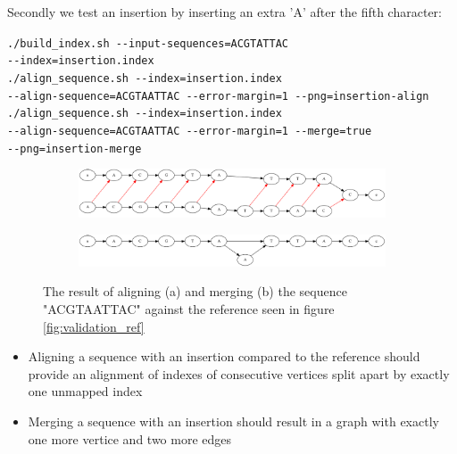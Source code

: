 \documentclass[thesis.tex]{subfiles}
\begin{document}
Secondly we test an insertion by inserting an extra 'A' after the fifth character:\\
\par\noindent
\texttt{./build\_index.sh -{}-input-sequences=ACGTATTAC \\
-{}-index=insertion.index}\\
\texttt{./align\_sequence.sh -{}-index=insertion.index \\
-{}-align-sequence=ACGTAATTAC -{}-error-margin=1 -{}-png=insertion-align}\\
\texttt{./align\_sequence.sh -{}-index=insertion.index \\
-{}-align-sequence=ACGTAATTAC -{}-error-margin=1 -{}-merge=true \\
-{}-png=insertion-merge}\\
\begin{figure}[!h]
  \begin{mdframed}
  \begin{subfigure}[t]{\textwidth}
      \includegraphics[width=\textwidth]{output/insertion-align.png}
    \subcaption{}
  \end{subfigure}
  \begin{subfigure}[t]{\textwidth}
      \includegraphics[width=\textwidth]{output/insertion-merge.png}
    \subcaption{}
  \end{subfigure} 
\end{mdframed}
  \caption[Aligning and merging an insertion with \ref{fig:validation_ref}]{The result of aligning (a) and merging (b) the sequence "ACGTAATTAC" against the reference seen in figure \ref{fig:validation_ref}}
  \label{fig:validation_insertion}
\end{figure}
\begin{itemize}
\item Aligning a sequence with an insertion compared to the reference should provide an alignment of indexes of consecutive vertices split apart by exactly one unmapped index
\item Merging a sequence with an insertion should result in a graph with exactly one more vertice and two more edges
\end{itemize}
\end{document}
